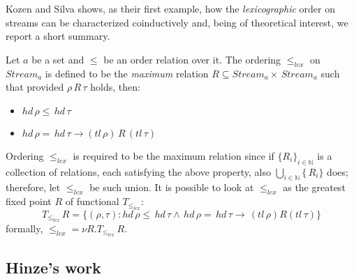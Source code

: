 Kozen and Silva shows, as their first example, how the \emph{lexicographic} order
on streams can be characterized coinductively and, being of theoretical interest,
we report a short summary.

Let $a$ be a set and $\leq$ be an order relation over it. The ordering $\leq_{lex}$
on $Stream_{a}$ is defined to be the \emph{maximum} relation $R\subseteq Stream_{a}\times\,Stream_{a}$ 
such that provided $\rho\,R\,\tau$ holds, then:
\begin{itemize}
    \item $hd\,\rho\leq\,hd\,\tau$ 
    \item $hd\,\rho=\,hd\,\tau \rightarrow (tl\,\rho)\,R\,(tl\,\tau)$ 
\end{itemize}
Ordering $\leq_{lex}$ is required to be the maximum relation since if 
$\lbrace R_{i}\rbrace_{i\in\mathbb{N}}$ is a collection of relations, each satisfying the above
property, also $\bigcup_{i\in\mathbb{N}}\lbrace\,R_{i}\rbrace$ does; therefore, let $\leq_{lex}$
be such union. It is possible to look at $\leq_{lex}$ as the greatest fixed point $R$
of functional $T_{\leq_{lex}}$:
\begin{displaymath}
    T_{\leq_{lex}}\,R = \lbrace (\rho,\tau) : hd\,\rho \leq\,hd\,\tau\wedge\,
        hd\,\rho=\,hd\,\tau\rightarrow\,(tl\,\rho) R (tl\,\tau) \rbrace
\end{displaymath}
formally, $\leq_{lex} = \nu R. T_{\leq_{lex}}\,R$.

\subsection{Hinze's work}

